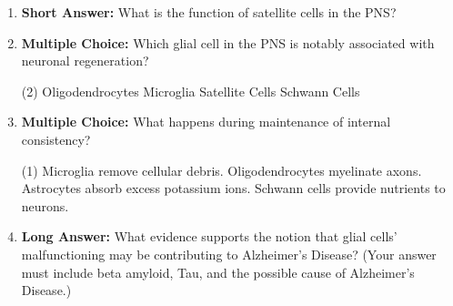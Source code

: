 \begin{enumerate}[label=\textbf{Q2.1.\arabic*}]
            \begin{tasks}[label=\textcolor{\documentTheme}{(\Alph*)}, item-format=\color{\documentTheme}, label-width=1.5em, item-indent=1.7em](2)
                  \task Astrocytes
                  \task Ependymal Glia
                  \task Schwann Cells
                  \task Microglia
            \end{tasks}
      \item \textbf{Short Answer:} What is the function of satellite cells in the PNS? \\

      \item \textbf{Multiple Choice:} Which glial cell in the PNS is notably associated with neuronal regeneration?
            \begin{tasks}[label=\textcolor{\documentTheme}{(\Alph*)}, item-format=\color{\documentTheme}, label-width=1.5em, item-indent=1.7em](2)
                  \task Oligodendrocytes
                  \task Microglia
                  \task Satellite Cells
                  \task Schwann Cells
            \end{tasks}

      \item \textbf{Multiple Choice:} What happens during maintenance of internal consistency?
            \begin{tasks}[label=\textcolor{\documentTheme}{(\Alph*)}, item-format=\color{\documentTheme}, label-width=1.5em, item-indent=1.7em](1)
                  \task Microglia remove cellular debris.
                  \task Oligodendrocytes myelinate axons.
                  \task Astrocytes absorb excess potassium ions.
                  \task Schwann cells provide nutrients to neurons.
            \end{tasks}
      \item \textbf{Long Answer:} What evidence supports the notion that glial cells' malfunctioning may be contributing to Alzheimer's Disease? (Your answer must include beta amyloid, Tau, and the possible cause of Alzheimer's Disease.) \\

\end{enumerate}
\newpage
\squigglyline

